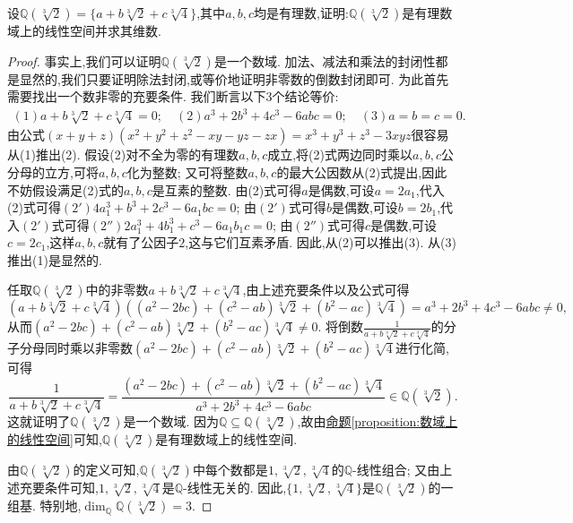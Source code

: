 \documentclass[../../main.tex]{subfiles}%
\begin{document}
\begin{example}
设\(\mathbb{Q}(\sqrt[3]{2})=\{a + b\sqrt[3]{2}+c\sqrt[3]{4}\}\),其中\(a,b,c\)均是有理数,证明:\(\mathbb{Q}(\sqrt[3]{2})\)是有理数域上的线性空间并求其维数.
\end{example}
\begin{proof}

事实上,我们可以证明\(\mathbb{Q}(\sqrt[3]{2})\)是一个数域. 加法、减法和乘法的封闭性都是显然的,我们只要证明除法封闭,或等价地证明非零数的倒数封闭即可. 为此首先需要找出一个数非零的充要条件. 我们断言以下3个结论等价:
\begin{gather*}
(1) a + b\sqrt[3]{2}+c\sqrt[3]{4}=0;\quad(2) a^3 + 2b^3+4c^3-6abc = 0;\quad (3) a = b = c = 0.
\end{gather*}
由公式\((x + y + z)(x^2 + y^2+z^2-xy - yz - zx)=x^3 + y^3+z^3-3xyz\)很容易从(1)推出(2). 假设(2)对不全为零的有理数\(a,b,c\)成立,将(2)式两边同时乘以\(a,b,c\)公分母的立方,可将\(a,b,c\)化为整数; 又可将整数\(a,b,c\)的最大公因数从(2)式提出,因此不妨假设满足(2)式的\(a,b,c\)是互素的整数. 由(2)式可得\(a\)是偶数,可设\(a = 2a_1\),代入(2)式可得\((2')4a_1^3 + b^3+2c^3-6a_1bc = 0\); 由\((2')\)式可得\(b\)是偶数,可设\(b = 2b_1\),代入\((2')\)式可得\((2'')2a_1^3 + 4b_1^3+c^3-6a_1b_1c = 0\); 由\((2'')\)式可得\(c\)是偶数,可设\(c = 2c_1\),这样\(a,b,c\)就有了公因子\(2\),这与它们互素矛盾. 因此,从(2)可以推出(3). 从(3)推出(1)是显然的.

任取\(\mathbb{Q}(\sqrt[3]{2})\)中的非零数\(a + b\sqrt[3]{2}+c\sqrt[3]{4}\),由上述充要条件以及公式可得
\[
(a + b\sqrt[3]{2}+c\sqrt[3]{4})((a^2 - 2bc)+(c^2 - ab)\sqrt[3]{2}+(b^2 - ac)\sqrt[3]{4})=a^3 + 2b^3+4c^3-6abc\neq0,
\]
从而\((a^2 - 2bc)+(c^2 - ab)\sqrt[3]{2}+(b^2 - ac)\sqrt[3]{4}\neq0\). 将倒数\(\frac{1}{a + b\sqrt[3]{2}+c\sqrt[3]{4}}\)的分子分母同时乘以非零数\((a^2 - 2bc)+(c^2 - ab)\sqrt[3]{2}+(b^2 - ac)\sqrt[3]{4}\)进行化简,可得
\[
\frac{1}{a + b\sqrt[3]{2}+c\sqrt[3]{4}}=\frac{(a^2 - 2bc)+(c^2 - ab)\sqrt[3]{2}+(b^2 - ac)\sqrt[3]{4}}{a^3 + 2b^3+4c^3-6abc}\in\mathbb{Q}(\sqrt[3]{2}).
\]
这就证明了\(\mathbb{Q}(\sqrt[3]{2})\)是一个数域. 因为\(\mathbb{Q}\subseteq\mathbb{Q}(\sqrt[3]{2})\),故由\hyperref[proposition:数域上的线性空间]{命题\ref{proposition:数域上的线性空间}}可知,\(\mathbb{Q}(\sqrt[3]{2})\)是有理数域上的线性空间.

由\(\mathbb{Q}(\sqrt[3]{2})\)的定义可知,\(\mathbb{Q}(\sqrt[3]{2})\)中每个数都是\(1,\sqrt[3]{2},\sqrt[3]{4}\)的\(\mathbb{Q}\)-线性组合; 又由上述充要条件可知,\(1,\sqrt[3]{2},\sqrt[3]{4}\)是\(\mathbb{Q}\)-线性无关的. 因此,\(\{1,\sqrt[3]{2},\sqrt[3]{4}\}\)是\(\mathbb{Q}(\sqrt[3]{2})\)的一组基. 特别地,\(\dim_{\mathbb{Q}}\mathbb{Q}(\sqrt[3]{2}) = 3\).

\end{proof}
\end{document}
